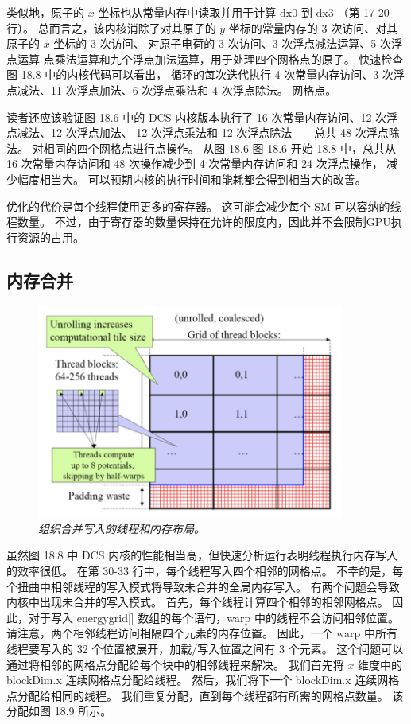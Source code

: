 类似地，原子的 $x$ 坐标也从常量内存中读取并用于计算 $\mathrm{dx} 0$ 到 $\mathrm{dx} 3$ （第 17-20 行）。 
总而言之，该内核消除了对其原子的 $y$ 坐标的常量内存的 3 次访问、对其原子的 $x$ 坐标的 3 次访问、
对原子电荷的 3 次访问、3 次浮点减法运算、5 次浮点运算 点乘法运算和九个浮点加法运算，用于处理四个网格点的原子。 
快速检查图 18.8 中的内核代码可以看出，
循环的每次迭代执行 4 次常量内存访问、3 次浮点减法、11 次浮点加法、6 次浮点乘法和 4 次浮点除法。 网格点。

读者还应该验证图 18.6 中的 DCS 内核版本执行了 16 次常量内存访问、12 次浮点减法、12 次浮点加法、
12 次浮点乘法和 12 次浮点除法——总共 48 次浮点除法。 对相同的四个网格点进行点操作。 
从图 18.6-图 18.6 开始 18.8 中，总共从 16 次常量内存访问和 48 次操作减少到 4 次常量内存访问和 24 次浮点操作，
减少幅度相当大。 可以预期内核的执行时间和能耗都会得到相当大的改善。

优化的代价是每个线程使用更多的寄存器。 这可能会减少每个 SM 可以容纳的线程数量。 
不过，由于寄存器的数量保持在允许的限度内，因此并不会限制GPU执行资源的占用。

\subsection{内存合并}
\begin{figure}[H]
	\centering
	\includegraphics[width=0.9\textwidth]{figs/F18.9.png}
	\caption{\textit{组织合并写入的线程和内存布局。}}
\end{figure}

虽然图 18.8 中 DCS 内核的性能相当高，但快速分析运行表明线程执行内存写入的效率很低。 
在第 30-33 行中，每个线程写入四个相邻的网格点。 不幸的是，每个扭曲中相邻线程的写入模式将导致未合并的全局内存写入。 
有两个问题会导致内核中出现未合并的写入模式。 首先，每个线程计算四个相邻的相邻网格点。 
因此，对于写入 energygrid[] 数组的每个语句，warp 中的线程不会访问相邻位置。 
请注意，两个相邻线程访问相隔四个元素的内存位置。 
因此，一个 warp 中所有线程要写入的 32 个位置被展开，加载/写入位置之间有 3 个元素。 
这个问题可以通过将相邻的网格点分配给每个块中的相邻线程来解决。 
我们首先将 $x$ 维度中的 blockDim.x 连续网格点分配给线程。 
然后，我们将下一个 blockDim.x 连续网格点分配给相同的线程。 
我们重复分配，直到每个线程都有所需的网格点数量。 该分配如图 18.9 所示。

